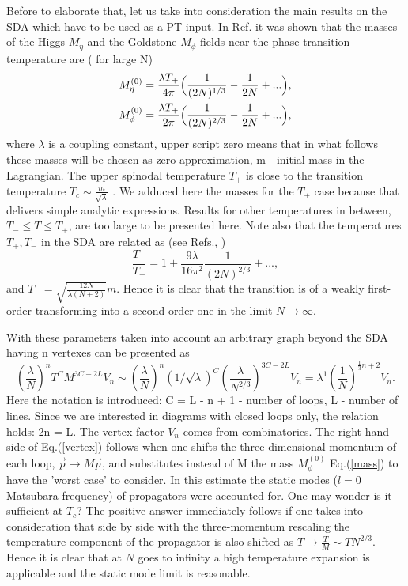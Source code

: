 \documentclass[a4paper,12pt]{article}
\begin{document}
Before to elaborate that, let us take into consideration the main
results on the SDA which have to be used as a PT input. In
Ref. \cite{pl} it was shown that the masses of the Higgs $M_{\eta}$
and the Goldstone $M_{\phi}$ fields near the phase transition
temperature are ( for large N)
\begin{eqnarray} \label{mass}
M^{(0)}_{\eta} = \frac{\lambda T_+}{4 \pi}\Bigl( \frac{1}{(2N)^{1/3}}
- \frac{1}{2N}+ ...\Bigr) ,\\ \nonumber M^{(0)}_{\phi} = \frac{\lambda
T_+}{2 \pi} \Bigl( \frac{1}{(2N)^{2/3}} - \frac{1}{2N} + ...\Bigr) ,
\end{eqnarray}
where $\lambda$ is a coupling constant, upper script zero means that
in what follows these masses will be chosen as zero approximation, m -
initial mass in the Lagrangian. The upper spinodal temperature $T_+$
is close to the transition temperature $T_c \sim
\frac{m}{\sqrt{\lambda}}$ . We adduced here the masses for the $T_+$
case because that delivers simple analytic expressions. Results for
other temperatures in between, $T_- \le T \le T_+$, are too large to
be presented here. Note also that the temperatures $T_+, T_-$ in the
SDA are related as (see Refs.\cite{prd}, \cite{pl})
\begin{equation} \label{tt}
\frac{T_+}{T_-} = 1 + \frac{9 \lambda}{16 \pi^2} \frac{1}{(2N)^{2/3}} +
  ...,
\end{equation}
 and $T_- = \sqrt{\frac{12N}{\lambda (N + 2)}} m$. Hence it is clear
 that the transition is of a weakly first-order transforming into a
 second order one in the limit $N \to \infty$.

With these parameters taken into account an arbitrary graph beyond the
SDA having n vertexes can be presented as
\begin{equation} \label{vertex}
(\frac{\lambda}{N})^n T^C M^{3C-2L} V_n \sim (\frac{\lambda}{N})^n
(1/\sqrt{\lambda})^{C} ( \frac{\lambda}{N^{2/3}})^{3C-2L} V_n =
\lambda^1 (\frac{1}{N})^{\frac{1}{3}n + 2}V_n.
\end{equation}
Here the notation is introduced: C = L - n + 1 - number of loops, L -
number of lines. Since we are interested in diagrams with closed loops
only, the relation holds: 2n = L. The vertex factor $V_n$ comes from
combinatorics.  The right-hand-side of Eq.(\ref{vertex}) follows when
one shifts the three dimensional momentum of each loop, $\vec{p}
\rightarrow M \vec{p}$, and substitutes instead of M the mass
$M^{(0)}_{\phi}$ Eq.(\ref{mass}) to have the 'worst case' to
consider. In this estimate the static modes ($ l = 0$ Matsubara
frequency) of propagators were accounted for. One may wonder is it
sufficient at $T_c$? The positive answer immediately follows if one
takes into consideration that side by side with the three-momentum
rescaling the temperature component of the propagator is also shifted
as $T \to \frac{T}{M} \sim T N^{2/3}$. Hence it is clear that at $N$
goes to infinity a high temperature expansion is applicable and the
static mode limit is reasonable.
\end{document}
